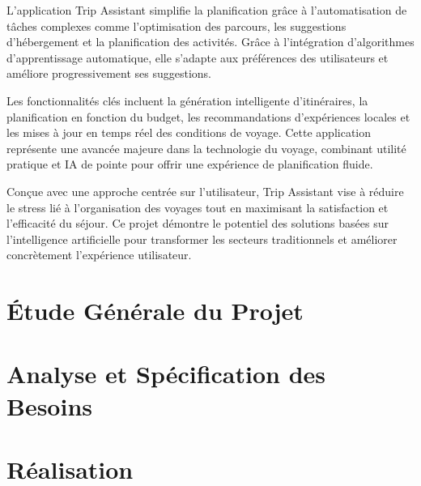 \documentclass{rapportESPRIM}
\begin{document}
L'application Trip Assistant simplifie la planification grâce à l’automatisation de tâches complexes comme l’optimisation des parcours, les suggestions d’hébergement et la planification des activités. Grâce à l’intégration d’algorithmes d’apprentissage automatique, elle s’adapte aux préférences des utilisateurs et améliore progressivement ses suggestions.

Les fonctionnalités clés incluent la génération intelligente d’itinéraires, la planification en fonction du budget, les recommandations d’expériences locales et les mises à jour en temps réel des conditions de voyage. Cette application représente une avancée majeure dans la technologie du voyage, combinant utilité pratique et IA de pointe pour offrir une expérience de planification fluide.

Conçue avec une approche centrée sur l’utilisateur, Trip Assistant vise à réduire le stress lié à l’organisation des voyages tout en maximisant la satisfaction et l’efficacité du séjour. Ce projet démontre le potentiel des solutions basées sur l’intelligence artificielle pour transformer les secteurs traditionnels et améliorer concrètement l’expérience utilisateur.


\clearpage
\tableofcontents
\clearpage

\listoffigures
\clearpage

\listoftables
\clearpage


\chapter{Étude Générale du Projet}


\chapter{Analyse et Spécification des Besoins}


\chapter{Réalisation}

\end{document}
